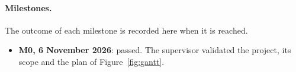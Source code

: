 \paragraph{Milestones.} The outcome of each milestone is recorded here when it is reached.
\begin{itemize}
  \item \textbf{M0, 6 November 2026}: passed. The supervisor validated the project, its scope and
        the plan of Figure~\ref{fig:gantt}.
\end{itemize}

